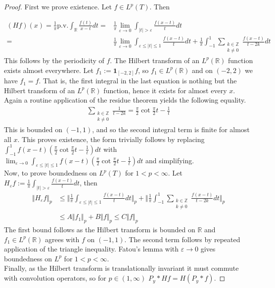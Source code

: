\documentclass[a4paper, oneside, 12pt]{amsart}
\newcommand{\eps}{\varepsilon}
\newcommand{\Z}{\mathbb{Z}}
\newcommand{\R}{\mathbb{R}}
\begin{document}
\begin{proof}
 First we prove existence. Let $f\in L^p(T)$. Then
 
    \begin{align*}
        (H f)(x) = \frac{1}{\pi} \mathrm{p.v.} \int_\R \frac{f(t)}{x-t} dt =& \frac{1}{\pi} 
	    \lim_{\eps\to 0}\int_{|t| > \eps} \frac{f(x-t)}{t}dt \\                                         
	    =& \frac{1}{\pi} \lim_{\eps\to 0} \int_{\eps \leq |t| \leq 1} \frac{f(x-t)}{t}dt +
	\frac{1}{\pi}\int_{-1}^1 \sum_{\substack{k\in\Z\\k\neq0}}\frac{f(x-t)}{t-2k}dt 
    \end{align*}
    This follows by the periodicity of $f$. The Hilbert transform of an
    $L^p(\R)$ function exists almost everywhere. Let $f_1 :=
    \mathbf{1}_{[-2, 2]} f$, so $f_1\in L^p(\R)$ and on $(-2, 2)$ we have
    $f_1 = f$. That is, the first integral in the last equation is
    nothing but the Hilbert transform of an $L^p(\R)$ function, hence it exists
    for almost every $x$. 
    Again a routine application of the residue theorem yields the following equality.
    \begin{align*}
        \sum_{\substack{k\in\Z\\k\neq0}} \frac{1}{t-2k} = \frac{\pi}{2}
	    \cot \frac{\pi}{2}t - \frac{1}{t}
    \end{align*}
    This is bounded on $(-1, 1)$, and so the second integral term is finite for
    almost all $x$. This proves existence, the form trivially follows by
    replacing $\int_{-1}^1 f(x-t) \left(\frac{\pi}{2}\cot \frac{\pi}{2}t
    - \frac{1}{t}\right)dt$ with 
    $\lim_{\eps\to 0} \int_{\eps \leq |t| \leq 1}  f(x-t) 
	\left(\frac{\pi}{2}\cot \frac{\pi}{2}t - \frac{1}{t}\right)dt$ and simplifying.\\
    
    Now, to prove boundedness on $L^p(T)$ for $1 < p < \infty$. Let $H_\eps f :=  
	\frac{1}{\pi} \int_{|t| > \eps} \frac{ f(x-t)}{t}dt$, then
    \begin{align*}
        \Vert H_\eps  f\Vert_p &\leq \bigg\Vert \frac{1}{\pi} \int_{\eps \leq |t| \leq 1} 
	    \frac{ f(x-t)}{t}dt \bigg \Vert_p + 
        \bigg\Vert \frac{1}{\pi}\int_{-1}^1 \sum_{\substack{k\in\Z\\k\neq0}}
	    \frac{ f(x-t)}{t-2k}dt\bigg\Vert_p  \\ &\leq A\Vert f_1\Vert_p + B \Vert  
	    f\Vert_p \leq C\Vert f\Vert_p 
    \end{align*}
    The first bound follows as the Hilbert transform is bounded on $\R$ and $f_1\in L^p(\R)$ agrees 
	with $f$ on $(-1, 1)$. The second term follows by repeated application of the triangle 
	inequality. Fatou's lemma with $\eps \to 0$ gives boundedness on $L^p$ 
	for $1 < p < \infty$. \\

    Finally, as the Hilbert transform is translationally invariant it must commute with 
	convolution operators, so for $p\in(1, \infty)$ $P_y\ast Hf = H (P_y \ast f)$.
\end{proof}
\end{document}
